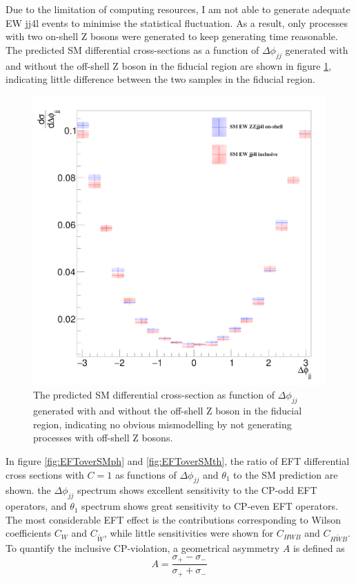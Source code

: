 \documentclass[a4paper,12pt]{article}
\begin{document}
			\par Due to the limitation of computing resources, I am not able to generate adequate EW jj4l events to minimise
			the statistical fluctuation. As a result, only processes with two on-shell Z bosons were generated to 
			keep generating time reasonable. The predicted SM differential cross-sections as a function of $\Delta\phi_{jj}$ 
			generated with and without the off-shell Z boson in the fiducial region are shown in figure \ref{fig:SMvali}, indicating
			little difference between the two samples in the fiducial region. 
			\begin{figure}[ht]
				\begin{centering}
				\includegraphics[scale=0.15]{figures/smvali.png}
				\caption{The predicted SM differential cross-section as function of $\Delta\phi_{jj}$ generated with and without the off-shell Z boson in the fiducial region, indicating no obvious mismodelling by not generating processes with off-shell Z bosons.}
				\label{fig:SMvali}
				\end{centering}
			\end{figure}
			\par In figure \ref{fig:EFToverSMph} and \ref{fig:EFToverSMth}, the ratio of EFT differential cross sections with $C=1$ as functions of 
			$\Delta\phi_{jj}$ and $\theta_1$ to the SM prediction are shown. the $\Delta\phi_{jj}$ spectrum shows excellent sensitivity to the 
			CP-odd EFT operators, and $\theta_1$ spectrum shows great sensitivity to CP-even EFT operators. The most considerable EFT effect is 
			the contributions corresponding to Wilson coefficients $C_W$ and $C_{\tilde{W}}$, while little sensitivities were shown for
			$C_{HWB}$ and $C_{H\tilde{W}B}$. To quantify the inclusive CP-violation, a geometrical asymmetry $A$ is defined as
			\begin{equation}
				A = \frac{\sigma_{+} - \sigma_{-}}{\sigma_{+} + \sigma_{-}}
			\end{equation}
			
\end{document}
